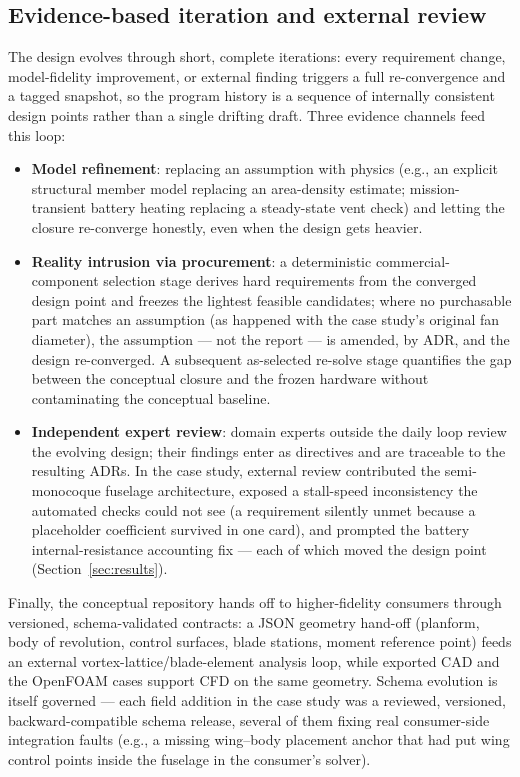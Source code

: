 \subsection{Evidence-based iteration and external review}
\label{sec:iteration}

The design evolves through short, complete iterations: every
requirement change, model-fidelity improvement, or external finding
triggers a full re-convergence and a tagged snapshot, so the program
history is a sequence of internally consistent design points rather
than a single drifting draft. Three evidence channels feed this loop:

\begin{itemize}[nosep]
\item \textbf{Model refinement}: replacing an assumption with physics
  (e.g., an explicit structural member model replacing an area-density
  estimate; mission-transient battery heating replacing a steady-state
  vent check) and letting the closure re-converge honestly, even when
  the design gets heavier.
\item \textbf{Reality intrusion via procurement}: a deterministic
  commercial-component selection stage derives hard requirements from
  the converged design point and freezes the lightest feasible
  candidates; where no purchasable part matches an assumption (as
  happened with the case study's original fan diameter), the
  assumption --- not the report --- is amended, by ADR, and the design
  re-converged. A subsequent as-selected re-solve stage quantifies the
  gap between the conceptual closure and the frozen hardware without
  contaminating the conceptual baseline.
\item \textbf{Independent expert review}: domain experts outside the
  daily loop review the evolving design; their findings enter as
  directives and are traceable to the resulting ADRs. In the case
  study, external review contributed the semi-monocoque fuselage
  architecture, exposed a stall-speed inconsistency the automated
  checks could not see (a requirement silently unmet because a
  placeholder coefficient survived in one card), and prompted the
  battery internal-resistance accounting fix --- each of which moved
  the design point (Section~\ref{sec:results}).
\end{itemize}

Finally, the conceptual repository hands off to higher-fidelity
consumers through versioned, schema-validated contracts: a JSON
geometry hand-off (planform, body of revolution, control surfaces,
blade stations, moment reference point) feeds an external
vortex-lattice/blade-element analysis loop, while exported CAD and the
OpenFOAM cases support CFD on the same geometry. Schema evolution is
itself governed --- each field addition in the case study was a
reviewed, versioned, backward-compatible schema release, several of
them fixing real consumer-side integration faults (e.g., a missing
wing--body placement anchor that had put wing control points inside
the fuselage in the consumer's solver).
